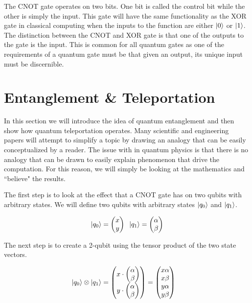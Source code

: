 \documentclass[conference]{IEEEtran}
\begin{document}
The CNOT gate operates on two bits. One bit is called the control bit while the other is simply the input. This gate will have the same functionality as the XOR gate in classical computing when the inputs to the function are either $\ket{0}$ or $\ket{1}$. The distinction between the CNOT and XOR gate is that one of the outputs to the gate is the input. This is common for all quantum gates as one of the requirements of a quantum gate must be that given an output, its unique input must be discernible.

\section{Entanglement \& Teleportation}

In this section we will introduce the idea of quantum entanglement and then show how quantum teleportation operates. Many scientific and engineering papers will attempt to simplify a topic by drawing an analogy that can be easily conceptualized by a reader. The issue with in quantum physics is that there is no analogy that can be drawn to easily explain phenomenon that drive the computation. For this reason, we will simply be looking at the mathematics and ``believe" the results.

The first step is to look at the effect that a CNOT gate has on two qubits with arbitrary states. We will define two qubits with arbitrary states $\ket{q_0}$ and $\ket{q_1}$.

\begin{align*}
\ket{q_0} = \begin{pmatrix}x\\y\end{pmatrix}\;\;
\ket{q_1} = \begin{pmatrix}\alpha\\\beta\end{pmatrix}
\end{align*}

The next step is to create a 2-qubit using the tensor product of the two state vectors.

\begin{align*}
\ket{q_0} \otimes \ket{q_1} &= \begin{pmatrix}
x \cdot \begin{pmatrix}\alpha\\\beta\end{pmatrix}\\
y \cdot \begin{pmatrix}\alpha\\\beta\end{pmatrix}
\end{pmatrix}
= \begin{pmatrix}x\alpha\\x\beta\\y\alpha\\y\beta\end{pmatrix}
\end{align*}
\end{document}
